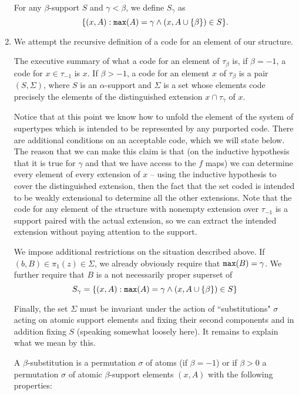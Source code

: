 \documentclass[12pt]{article}
\begin{document}
\begin{enumerate}
For any $\beta$-support $S$ and $\gamma<\beta$, we define $S_\gamma$ as $$\{(x,A):{\tt max}(A)=\gamma \wedge (x,A\cup \{\beta\}) \in S\}.$$

\item  We attempt the recursive definition of a code for an element of our structure.

The executive summary of what a code for an element of $\tau_\beta$ is, if $\beta=-1$, a code for $x \in \tau_{-1}$ is $x$.  If $\beta>-1$, a code for an element $x$ of $\tau_\beta$ is a pair $(S,\Sigma)$, where $S$ is an $\alpha$-support and
$\Sigma$ is a set whose elements code precisely the elements of the distinguished extension $x \cap \tau_\gamma$ of $x$.

Notice that at this point we know how to unfold the element of the system of supertypes which is intended to be represented by any purported code.  There are additional conditions on an acceptable code, which we will state below.
The reason that we can make this claim is that (on the inductive hypothesis that it is true for $\gamma$ and that we have access to the $f$ maps) we can determine every element of every extension of $x$ -- using the inductive hypothesis to cover the distinguished extension, then the fact
that the set coded is intended to be weakly extensional to determine all the other extensions.   Note that the code for any element of the structure with nonempty extension over  $\tau_{-1}$ is a support paired with the actual extension, so we can extract the intended extension without paying
attention to the support.

We impose additional restrictions on the situation described above.  If $(b,B) \in \pi_1(z) \in \Sigma$, we already obviously require that ${\tt max}(B)=\gamma$.  We further require that $B$ is a not necessarily proper superset of $$S_\gamma = \{(x,A):{\tt max}(A) = \gamma \wedge (x,A \cup \{\beta\}) \in S\}$$

Finally, the set $\Sigma$ must be invariant under the action of ``substitutions" $\sigma$ acting on atomic support elements and fixing their second components and in addition fixing $S$ (speaking somewhat loosely here).  It remains to explain what we mean by this.

A $\beta$-substitution is a permutation $\sigma$ of atoms (if $\beta=-1$) or if $\beta >0$  a permutation $\sigma$ of atomic $\beta$-support elements $(x,A)$ with the following properties:

\begin{enumerate}


\end{enumerate}
\end{enumerate}
\end{document}
